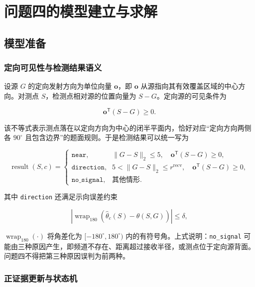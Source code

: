 \section{问题四的模型建立与求解}

\subsection{模型准备}

\subsubsection{定向可见性与检测结果语义}

设源 $G$ 的定向发射方向为单位向量 $\boldsymbol o$，即 $\boldsymbol o$ 从源指向其有效覆盖区域的中心方向。对测点 $S$，检测点相对源的位置向量为 $S-G$。定向源的可见条件为

\begin{equation}
\boldsymbol o^{\mathsf T}(S-G)\ge0.
\label{eq:q4_visibility}
\end{equation}

该不等式表示测点落在以定向方向为中心的闭半平面内，恰好对应“定向方向两侧各 $90^\circ$ 且包含边界”的题面规则。于是检测结果可以统一写为

\begin{equation}
\operatorname{result}(S,c)=
\begin{cases}
\texttt{near},&
\lVert G-S\rVert_2\le5,\quad \boldsymbol o^{\mathsf T}(S-G)\ge0,\\[2mm]
\texttt{direction},&
5<\lVert G-S\rVert_2\le r^{\mathrm{recv}},\quad
\boldsymbol o^{\mathsf T}(S-G)\ge0,\\[2mm]
\texttt{no\_signal},&
\text{其他情形}.
\end{cases}
\label{eq:q4_measure_semantics}
\end{equation}

其中 \texttt{direction} 还满足示向误差约束

\begin{equation}
\left|\operatorname{wrap}_{180}(\hat\theta_c(S)-\theta(S,G))\right|\le\delta,
\label{eq:q4_bearing_error}
\end{equation}

$\operatorname{wrap}_{180}(\cdot)$ 将角差化为 $[-180^\circ,180^\circ)$ 内的有符号角。上式说明：\texttt{no\_signal} 可能由三种原因产生，即频道不存在、距离超过接收半径，或测点位于定向源背面。问题四不得把第三种原因误判为前两种。

\subsubsection{正证据更新与状态机}

